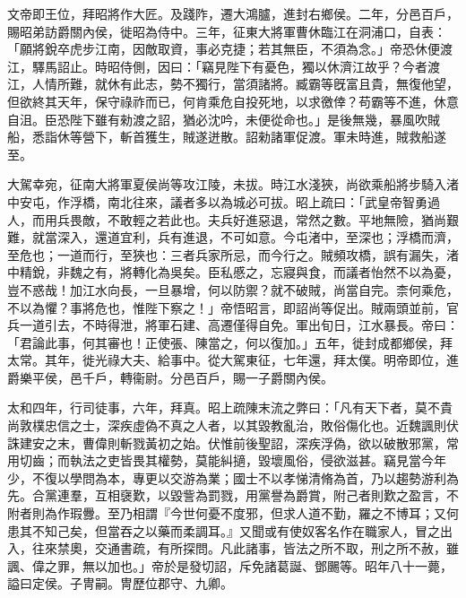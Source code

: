 \begin{pinyinscope}
 
 
 
 文帝即王位，拜昭將作大匠。及踐阼，遷大鴻臚，進封右鄉侯。二年，分邑百戶，賜昭弟訪爵關內侯，徙昭為侍中。三年，征東大將軍曹休臨江在洞浦口，自表：「願將銳卒虎步江南，因敵取資，事必克捷；若其無臣，不須為念。」帝恐休便渡江，驛馬詔止。時昭侍側，因曰：「竊見陛下有憂色，獨以休濟江故乎？今者渡江，人情所難，就休有此志，勢不獨行，當須諸將。臧霸等旣富且貴，無復他望，但欲終其天年，保守祿祚而已，何肯乘危自投死地，以求徼倖？苟霸等不進，休意自沮。臣恐陛下雖有勑渡之詔，猶必沈吟，未便從命也。」是後無幾，暴風吹賊船，悉詣休等營下，斬首獲生，賊遂迸散。詔勑諸軍促渡。軍未時進，賊救船遂至。
 
 
 
 
 大駕幸宛，征南大將軍夏侯尚等攻江陵，未拔。時江水淺狹，尚欲乘船將步騎入渚中安屯，作浮橋，南北往來，議者多以為城必可拔。昭上疏曰：「武皇帝智勇過人，而用兵畏敵，不敢輕之若此也。夫兵好進惡退，常然之數。平地無險，猶尚艱難，就當深入，還道宜利，兵有進退，不可如意。今屯渚中，至深也；浮橋而濟，至危也；一道而行，至狹也：三者兵家所忌，而今行之。賊頻攻橋，誤有漏失，渚中精銳，非魏之有，將轉化為吳矣。臣私慼之，忘寢與食，而議者怡然不以為憂，豈不惑哉！加江水向長，一旦暴增，何以防禦？就不破賊，尚當自完。柰何乘危，不以為懼？事將危也，惟陛下察之！」帝悟昭言，即詔尚等促出。賊兩頭並前，官兵一道引去，不時得泄，將軍石建、高遷僅得自免。軍出旬日，江水暴長。帝曰：「君論此事，何其審也！正使張、陳當之，何以復加。」五年，徙封成都鄉侯，拜太常。其年，徙光祿大夫、給事中。從大駕東征，七年還，拜太僕。明帝即位，進爵樂平侯，邑千戶，轉衞尉。分邑百戶，賜一子爵關內侯。
 
 
 
 
 太和四年，行司徒事，六年，拜真。昭上疏陳末流之弊曰：「凡有天下者，莫不貴尚敦樸忠信之士，深疾虛偽不真之人者，以其毀教亂治，敗俗傷化也。近魏諷則伏誅建安之末，曹偉則斬戮黃初之始。伏惟前後聖詔，深疾浮偽，欲以破散邪黨，常用切齒；而執法之吏皆畏其權勢，莫能糾擿，毀壞風俗，侵欲滋甚。竊見當今年少，不復以學問為本，專更以交游為業；國士不以孝悌清脩為首，乃以趨勢游利為先。合黨連羣，互相襃歎，以毀訾為罰戮，用黨譽為爵賞，附己者則歎之盈言，不附者則為作瑕釁。至乃相謂『今世何憂不度邪，但求人道不勤，羅之不博耳；又何患其不知己矣，但當吞之以藥而柔調耳。』又聞或有使奴客名作在職家人，冒之出入，往來禁奧，交通書疏，有所探問。凡此諸事，皆法之所不取，刑之所不赦，雖諷、偉之罪，無以加也。」帝於是發切詔，斥免諸葛誕、鄧颺等。昭年八十一薨，謚曰定侯。子冑嗣。冑歷位郡守、九卿。
 
 
\end{pinyinscope}